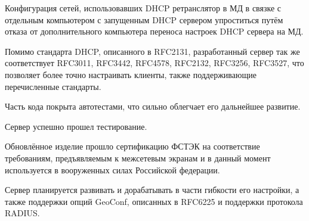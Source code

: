 \documentclass[14pt]{extarticle}
\begin{document}
Конфигурация сетей, использовавших DHCP ретранслятор в МД в связке с отдельным компьютером с запущенным DHCP сервером упроститься путём отказа от дополнительного компьютера переноса настроек DHCP сервера на МД.

Помимо стандарта DHCP, описанного в RFC2131, разработанный сервер так же соответствует RFC3011, RFC3442, RFC4578, RFC2132, RFC3256, RFC3527, что позволяет более точно настраивать клиенты, также поддерживающие перечисленные стандарты.

Часть кода покрыта автотестами, что сильно облегчает его дальнейшее развитие.

Сервер успешно прошел тестирование.

Обновлённое изделие прошло сертификацию ФСТЭК на соответствие требованиям, предъявляемым к межсетевым экранам и в данный момент используется в вооруженных силах Российской федерации.

Сервер планируется развивать и дорабатывать в части гибкости его настройки, а также поддержки опций GeoConf, описанных в RFC6225 и поддержки протокола RADIUS.
\end{document}
